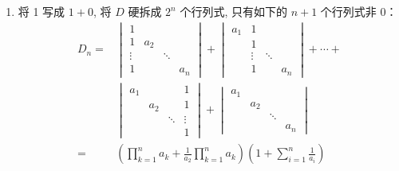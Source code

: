 \begin{enumerate}
\begin{enumerate}
              \item 将 1 写成 $1+0$, 将 $D$ 硬拆成 $2^{n}$ 个行列式, 只有如下的 $n+1$ 个行列式非 0：
                    \begin{align*}
                        D_n = & \begin{vmatrix}
                                    1      &       &        &       \\
                                    1      & a_{2} &        &       \\
                                    \vdots &       & \ddots &       \\
                                    1      &       &        & a_{n}
                                \end{vmatrix}
                        +\begin{vmatrix}
                             a_{1} & 1      &                \\
                                   & 1      &                \\
                                   & \vdots & \ddots &       \\
                                   & 1      &        & a_{n}
                         \end{vmatrix}+\cdots+              \\
                              & \begin{vmatrix}
                                    a_{1} &       &        & 1      \\
                                          & a_{2} &        & 1      \\
                                          &       & \ddots & \vdots \\
                                          &       &        & 1
                                \end{vmatrix}
                        +\begin{vmatrix}
                             a_{1} &                      \\
                                   & a_{2} &              \\
                                   &       & \ddots &     \\
                                   &       &        & a_n
                         \end{vmatrix}                 \\
                        =     & \left(\prod_{k=1}^{n} a_{k}+\frac{1}{a_{2}}
                        \prod_{k=1}^{n} a_{k}\right)\left(1+\sum_{i=1}^{n} \frac{1}{a_{i}}\right)
                    \end{align*}
          \end{enumerate}


\end{enumerate}
